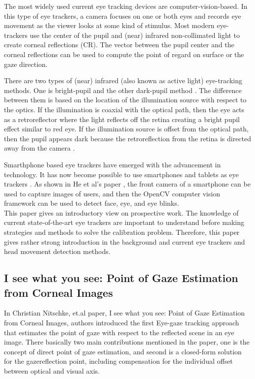 The most widely used current eye tracking devices are computer-vision-based. In this type of eye trackers, a camera focuses on one or both eyes and records eye movement as the viewer looks at some kind of stimulus. Most modern eye-trackers use the center of the pupil and (near) infrared non-collimated light to create corneal reflections (CR). The vector between the pupil center and the corneal reflections can be used to compute the point of regard on surface or the gaze direction. 

There are two types of (near) infrared (also known as active light) eye-tracking methods. One is bright-pupil and the other dark-pupil method \cite{10}. The difference between them is based on the location of the illumination source with respect to the optics. If the illumination is coaxial with the optical path, then the eye acts as a retroreflector where the light reflects off the retina creating a bright pupil effect similar to red eye. If the illumination source is offset from the optical path, then the pupil appears dark because the retroreflection from the retina is directed away from the camera \cite{10}.


Smarthphone based eye trackers have emerged with the advancement in technology. It has now become possible to use smartphones and tablets as eye trackers \cite{11}\cite{12}. As shown in He et al's paper \cite{14}, the front camera of a smartphone can be used to capture images of users, and then the OpenCV computer vision framework can be used to detect face, eye, and eye blinks.\\

This paper gives an introductory view on prospective work. The knowledge of current state-of-the-art eye trackers are important to understand before making strategies and methods to solve the calibration problem. Therefore, this paper gives rather strong introduction in the background and current eye trackers and head movement detection methods.

\subsection{I see what you see: Point of Gaze Estimation from Corneal Images}

In Christian Nitschke, et.al \cite{20} paper, I see what you see: Point of Gaze Estimation from Corneal Images, authors introduced the first Eye-gaze tracking approach that estimates the point of gaze  with respect to the reflected scene in an eye image. There basically two main contributions mentioned in the paper, one is the concept of direct point of gaze estimation, and second is a closed-form solution for the gazereflection point, including compensation for the individual offset between optical and visual axis.\\

